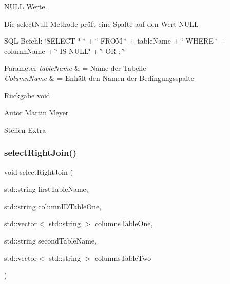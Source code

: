 N\+U\+LL Werte. 

Die select\+Null Methode prüft eine Spalte auf den Wert N\+U\+LL

S\+Q\+L-\/\+Befehl\+: \char`\"{}\+S\+E\+L\+E\+C\+T $\ast$ \char`\"{} + \char`\"{} F\+R\+O\+M \char`\"{} + table\+Name + \char`\"{} W\+H\+E\+R\+E \char`\"{} + column\+Name + \char`\"{} I\+S N\+U\+L\+L\char`\"{} + \char`\"{} O\+R \textquotesingle{} \textquotesingle{}; \char`\"{}


\begin{DoxyParams}{Parameter}
{\em table\+Name} & = Name der Tabelle \\
\hline
{\em Column\+Name} & = Enhält den Namen der Bedingungsspalte\\
\hline
\end{DoxyParams}
\begin{DoxyReturn}{Rückgabe}
void
\end{DoxyReturn}
\begin{DoxyAuthor}{Autor}
Martin Meyer 

Steffen Extra 
\end{DoxyAuthor}
\mbox{\label{selection_request_8cpp_aff2cca0ae3f40a8b3ec70e85702bb8fc}} 
\subsubsection{select\+Right\+Join()}
{\footnotesize\ttfamily void select\+Right\+Join (\begin{DoxyParamCaption}\item[{std\+::string}]{first\+Table\+Name,  }\item[{std\+::string}]{column\+I\+D\+Table\+One,  }\item[{std\+::vector$<$ std\+::string $>$}]{columns\+Table\+One,  }\item[{std\+::string}]{second\+Table\+Name,  }\item[{std\+::vector$<$ std\+::string $>$}]{columns\+Table\+Two }\end{DoxyParamCaption})}

